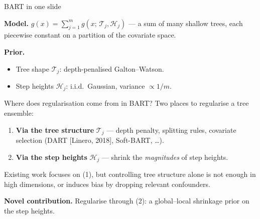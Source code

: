 \documentclass[10pt,aspectratio=169]{beamer}
\newcommand{\T}{\mathcal{T}}
\newcommand{\Hh}{\mathcal{H}}
\begin{document}
\begin{frame}{BART in one slide}
\vspace{-0.2em}

\textbf{Model.} $g(x) = \sum_{j=1}^{m} g(x;\, \T_j, \Hh_j)$ --- a sum of many shallow trees, each piecewise constant on a partition of the covariate space.

\vspace{0.3cm}

\textbf{Prior.}
\begin{itemize}
  \item Tree shape $\T_j$: depth-penalised Galton--Watson.
  \item Step heights $\Hh_j$: i.i.d.\ Gaussian, variance $\propto 1/m$.
\end{itemize}

\end{frame}

\begin{frame}{Where does regularisation come from in BART?}
Two places to regularise a tree ensemble:

\bigskip

\begin{enumerate}
  \item \textbf{Via the tree structure} $\T_j$ --- depth penalty, splitting rules, covariate selection (DART [Linero, 2018], Soft-BART, \ldots).
  \medskip
  \item \textbf{Via the step heights} $\Hh_j$ --- shrink the \emph{magnitudes} of step heights.
\end{enumerate}

\bigskip

Existing work focuses on (1), but controlling tree structure alone is not enough in high dimensions, or induces bias by dropping relevant confounders.
\bigskip

\textbf{Novel contribution.} Regularise through (2): a global--local shrinkage prior on the step heights.
\end{frame}
\end{document}
